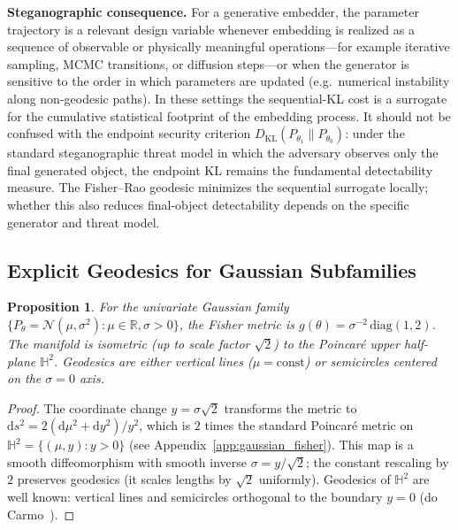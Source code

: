 \documentclass[a4paper,fleqn]{cas-dc}
\newtheorem{proposition}{Proposition}
\newcommand{\R}{\mathbb{R}}
\newcommand{\DKL}{D_{\mathrm{KL}}}
\begin{document}
\noindent\textbf{Steganographic consequence.}
For a generative embedder, the parameter trajectory is a relevant design
variable whenever embedding is realized as a sequence of observable or
physically meaningful operations---for example iterative sampling, MCMC
transitions, or diffusion steps---or when the generator is sensitive to the
order in which parameters are updated (e.g.\ numerical instability along
non-geodesic paths).  In these settings the sequential-KL cost is a surrogate
for the cumulative statistical footprint of the embedding process.  It should
not be confused with the endpoint security criterion
$\DKL(P_{\theta_1}\|P_{\theta_0})$: under the standard steganographic threat
model in which the adversary observes only the final generated object, the
endpoint KL remains the fundamental detectability measure.  The Fisher--Rao
geodesic minimizes the sequential surrogate locally; whether this also reduces
final-object detectability depends on the specific generator and threat model.

\subsection{Explicit Geodesics for Gaussian Subfamilies}

\begin{proposition}%
  \label{prop:gaussian_full_geodesic}
  For the univariate Gaussian family
  $\{P_\theta=\mathcal{N}(\mu,\sigma^2):\mu\in\R,\sigma>0\}$,
  the Fisher metric is
  $g(\theta) = \sigma^{-2}\,\mathrm{diag}(1, 2)$.
  The manifold is isometric (up to scale factor $\sqrt{2}$) to the
  Poincar\'{e} upper half-plane $\mathbb{H}^2$.
  Geodesics are either vertical lines ($\mu=\mathrm{const}$) or semicircles
  centered on the $\sigma=0$ axis.
\end{proposition}

\begin{proof}
  The coordinate change $y = \sigma\sqrt{2}$ transforms the metric to
  $\mathrm{d}s^2 = 2(\mathrm{d}\mu^2 + \mathrm{d}y^2)/y^2$, which is
  $2$ times the standard Poincar\'{e} metric on
  $\mathbb{H}^2 = \{(\mu,y): y>0\}$ (see Appendix~\ref{app:gaussian_fisher}).
  This map is a smooth diffeomorphism with smooth inverse
  $\sigma = y/\sqrt{2}$; the constant rescaling by $2$ preserves
  geodesics (it scales lengths by $\sqrt{2}$ uniformly).
  Geodesics of $\mathbb{H}^2$ are well known: vertical lines and
  semicircles orthogonal to the boundary $y=0$ (do Carmo~\cite{do2002riemannian}).
\end{proof}
\end{document}
